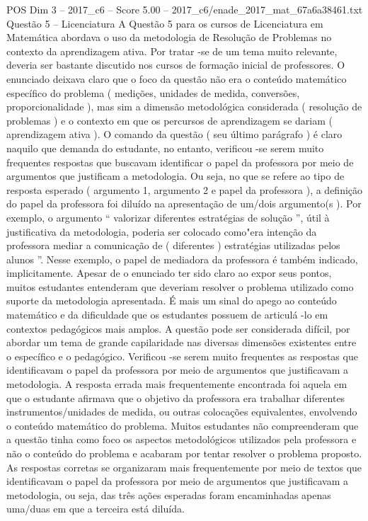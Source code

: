 \begin{textsample}{POS Dim 3 – 2017\_c6 – Score 5.00 – 2017\_c6/enade\_2017\_mat\_67a6a38461.txt}
Questão 5 – Licenciatura A Questão 5 para os cursos de Licenciatura em Matemática abordava o uso da metodologia de Resolução de Problemas no contexto da aprendizagem ativa.
Por tratar -se de um tema muito relevante, deveria ser bastante discutido nos cursos de formação inicial de professores.
O enunciado deixava claro que o foco da questão não era o conteúdo matemático específico do problema ( medições, unidades de medida, conversões, proporcionalidade ), mas sim a dimensão metodológica considerada ( resolução de problemas ) e o contexto em que os percursos de aprendizagem se dariam ( aprendizagem ativa ).
O comando da questão ( seu último parágrafo ) é claro naquilo que demanda do estudante, no entanto, verificou -se serem muito frequentes respostas que buscavam identificar o papel da professora por meio de argumentos que justificam a metodologia.
Ou seja, no que se refere ao tipo de resposta esperado ( argumento 1, argumento 2 e papel da professora ), a definição do papel da professora foi diluído na apresentação de um/dois argumento(s ).
Por exemplo, o argumento “ valorizar diferentes estratégias de solução ”, útil à justificativa da metodologia, poderia ser colocado como"era intenção da professora mediar a comunicação de ( diferentes ) estratégias utilizadas pelos alunos ”.
Nesse exemplo, o papel de mediadora da professora é também indicado, implicitamente.
Apesar de o enunciado ter sido claro ao expor seus pontos, muitos estudantes entenderam que deveriam resolver o problema utilizado como suporte da metodologia apresentada.
É mais um sinal do apego ao conteúdo matemático e da dificuldade que os estudantes possuem de articulá -lo em contextos pedagógicos mais amplos.
A questão pode ser considerada difícil, por abordar um tema de grande capilaridade nas diversas dimensões existentes entre o específico e o pedagógico.
Verificou -se serem muito frequentes as respostas que identificavam o papel da professora por meio de argumentos que justificavam a metodologia.
A resposta errada mais frequentemente encontrada foi aquela em que o estudante afirmava que o objetivo da professora era trabalhar diferentes instrumentos/unidades de medida, ou outras colocações equivalentes, envolvendo o conteúdo matemático do problema.
Muitos estudantes não compreenderam que a questão tinha como foco os aspectos metodológicos utilizados pela professora e não o conteúdo do problema e acabaram por tentar resolver o problema proposto.
As respostas corretas se organizaram mais frequentemente por meio de textos que identificavam o papel da professora por meio de argumentos que justificavam a metodologia, ou seja, das três ações esperadas foram encaminhadas apenas uma/duas em que a terceira está diluída.

\end{textsample}
